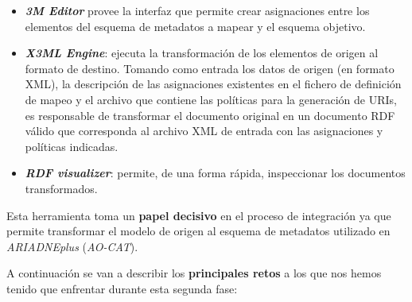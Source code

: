 
\begin{itemize}
\tightlist
\item
  \emph{\textbf{3M Editor}} provee la interfaz que permite crear asignaciones
  entre los elementos del esquema de metadatos a mapear y el esquema
  objetivo.
\end{itemize}


\begin{itemize}
\tightlist
\item
  \emph{\textbf{X3ML Engine}}: ejecuta la transformación de los elementos de
  origen al formato de destino. Tomando como entrada los datos de origen
  (en formato XML), la descripción de las asignaciones existentes en el
  fichero de definición de mapeo y el archivo que contiene las políticas
  para la generación de URIs, es responsable de transformar el documento
  original en un documento RDF válido que corresponda al archivo XML de
  entrada con las asignaciones y políticas indicadas.
\item
  \emph{\textbf{RDF visualizer}}: permite, de una forma rápida, inspeccionar los
  documentos transformados.
\end{itemize}


Esta herramienta toma un \textbf{papel decisivo} en el proceso de
integración ya que permite transformar el modelo de origen al esquema de
metadatos utilizado en \emph{ARIADNEplus} (\emph{AO-CAT}).

A continuación se van a describir los \textbf{principales \textbf{retos}} a los
que nos hemos tenido que enfrentar durante esta segunda fase:

